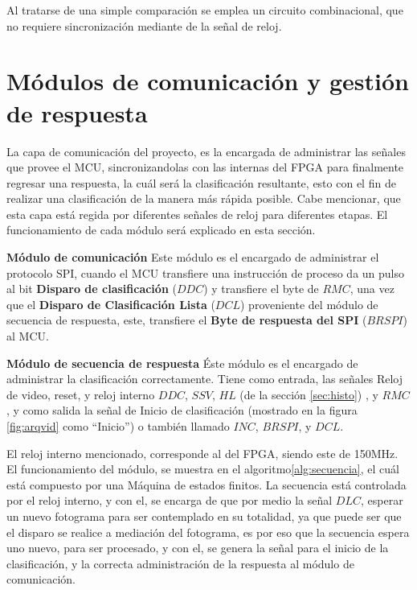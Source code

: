 \documentclass[twoside,spanish,ESP,MSc]{plantillaLabUPV}
\theoremstyle{definition}
\begin{document}
Al tratarse de una simple comparación se emplea un circuito combinacional, que no requiere sincronización mediante de la señal de reloj.


\section{Módulos de comunicación y gestión de respuesta} \label{sec:comm}
La capa de comunicación del proyecto, es la encargada de administrar las señales que provee el MCU, sincronizandolas con las internas del FPGA para finalmente regresar una respuesta, la cuál será la clasificación resultante, esto con el fin de realizar una clasificación de la manera más rápida posible. Cabe mencionar, que esta capa está regida por diferentes señales de reloj para diferentes etapas. El funcionamiento de cada módulo será explicado en esta sección.

\checkmark\textbf{Módulo de comunicación}
Este módulo es el encargado de administrar el protocolo SPI, cuando el MCU transfiere una instrucción de proceso da un pulso al bit \textbf{Disparo de clasificación} ($DDC$) y transfiere el byte de $RMC$, una vez que el \textbf{Disparo de Clasificación Lista} ($DCL$) proveniente del módulo de secuencia de respuesta, este, transfiere el \textbf{Byte de respuesta del SPI} ($BRSPI$) al MCU.

\checkmark\textbf{Módulo de secuencia de respuesta}
Éste módulo es el encargado de administrar la clasificación correctamente. Tiene como entrada, las señales Reloj de video, reset, y reloj interno $DDC$, $SSV$, $HL$ (de la sección \ref{sec:histo}) , y $RMC$ , y como salida la señal de Inicio de clasificación (mostrado en la figura \ref{fig:arqvid} como ``Inicio'') o también llamado $INC$, $BRSPI$, y $DCL$. 

El reloj interno mencionado, corresponde al del FPGA, siendo este de 150MHz. El funcionamiento del módulo, se muestra en el algoritmo\ref{alg:secuencia}, el cuál está compuesto por una Máquina de estados finitos. La secuencia está controlada por el reloj interno, y con el, se encarga de que por medio la señal $DLC$, esperar un nuevo fotograma para ser contemplado en su totalidad, ya que puede ser que el disparo se realice a mediación del fotograma, es por eso que la secuencia espera uno nuevo, para ser procesado, y con el, se genera la señal para el inicio de la clasificación, y la correcta administración de la respuesta al módulo de comunicación.  
\end{document}
